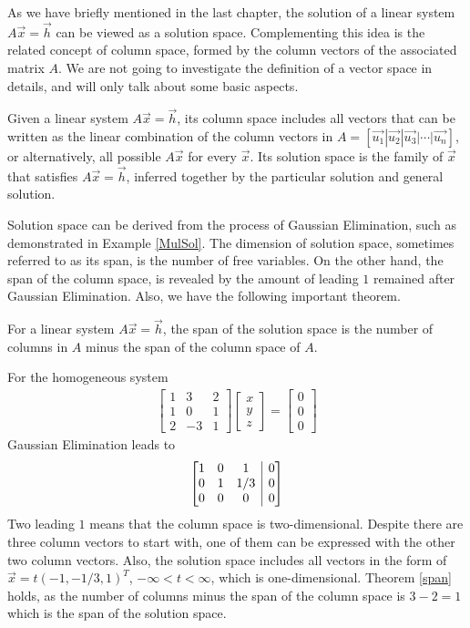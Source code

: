 As we have briefly mentioned in the last chapter, the solution of a linear system $A\vec{x} = \vec{h}$ can be viewed as a solution space. Complementing this idea is the related concept of column space, formed by the column vectors of the associated matrix $A$. We are not going to investigate the definition of a vector space in details, and will only talk about some basic aspects.
\begin{defn}
\label{columnspace}
Given a linear system $A\vec{x} = \vec{h}$, its column space includes all vectors that can be written as the linear combination of the column vectors in $A = [\vec{u_1}|\vec{u_2}|\vec{u_3}|\cdots|\vec{u_n}]$, or alternatively, all possible $A\vec{x}$ for every $\vec{x}$. Its solution space is the family of $\vec{x}$ that satisfies $A\vec{x} = \vec{h}$, inferred together by the particular solution and general solution.
\end{defn}
Solution space can be derived from the process of Gaussian Elimination, such as demonstrated in Example \ref{MulSol}. The dimension of solution space, sometimes referred to as its span, is the number of free variables. On the other hand, the span of the column space, is revealed by the amount of leading $1$ remained after Gaussian Elimination. Also, we have the following important theorem.
\begin{thm}
\label{span}
For a linear system $A\vec{x} = \vec{h}$, the span of the solution space is the number of columns in $A$ minus the span of the column space of $A$.
\end{thm}
\begin{exmp}
For the homogeneous system
\begin{align*}
\begin{bmatrix}
1 & 3 & 2\\
1 & 0 & 1\\
2 & -3 & 1
\end{bmatrix}
\begin{bmatrix}
x \\
y \\
z
\end{bmatrix}
=
\begin{bmatrix}
0\\
0\\
0
\end{bmatrix}
\end{align*}
Gaussian Elimination leads to
\begin{align*}
\left[\begin{array}{@{}ccc|c@{}}
1 & 0 & 1 & 0 \\
0 & 1 & 1/3 & 0 \\
0 & 0 & 0 & 0
\end{array}\right] 
\end{align*}
Two leading $1$ means that the column space is two-dimensional. Despite there are three column vectors to start with, one of them can be expressed with the other two column vectors. Also, the solution space includes all vectors in the form of $\vec{x} = t(-1, -1/3, 1)^T$, $-\infty < t < \infty$, which is one-dimensional. Theorem \ref{span} holds, as the number of columns minus the span of the column space is $3 - 2 = 1$ which is the span of the solution space.
\end{exmp}

